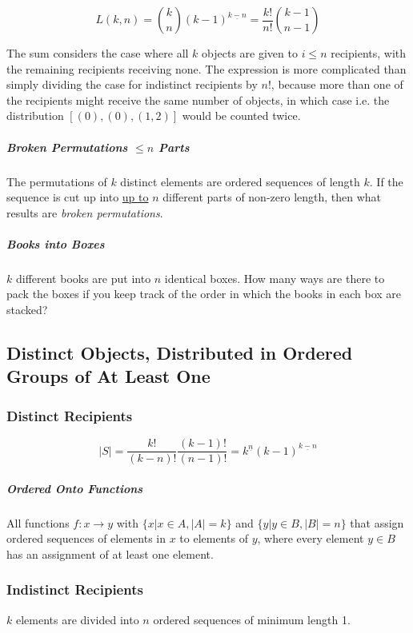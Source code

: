 \begin{equation}
L(k,n)= {k \choose n} (k-1)^{\underline{k-n}} = \frac{k!}{n!}{ k-1 \choose n-1 }
\end{equation}

The sum considers the case where all $k$ objects are given to $i\leq n$ recipients, with the remaining recipients receiving none. The expression is more complicated than simply dividing the case for indistinct recipients by $n!$, because more than one of the recipients might receive the same number of objects, in which case i.e. the distribution $[(0),(0),(1,2)]$ would be counted twice.

\subparagraph{Broken Permutations $\leq n$ Parts} The permutations of $k$ distinct elements are ordered sequences of length $k$. If the sequence is cut up into \underline{up to} $n$ different parts of non-zero length, then what results are \textit{broken permutations}.

\subparagraph{Books into Boxes} $k$ different books are put into $n$ identical boxes. How many ways are there to pack the boxes if you keep track of the order in which the books in each box are stacked? 


\subsection{Distinct Objects, Distributed in Ordered Groups of At Least One}

\subsubsection{Distinct Recipients}

\begin{equation}
|S| = \frac{k!}{(k-n)!}\frac{(k-1)!}{(n-1)!} = k^{\underline{n}} (k-1)^{\underline{k-n}}
\end{equation}

\subparagraph{Ordered Onto Functions} All functions $f: x \rightarrow y$ with $\{x | x\in A, |A| = k \}$ and $\{y | y\in B, |B| = n\}$ that assign ordered sequences of elements in $x$ to elements of $y$, where every element $y\in B$ has an assignment of at least one element.

\subsubsection{Indistinct Recipients}
$k$ elements are divided into $n$ ordered sequences of minimum length 1.

